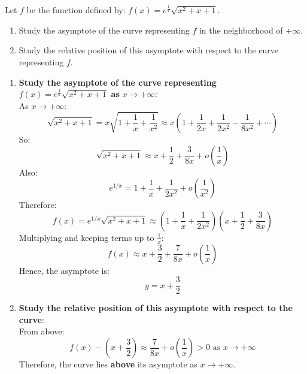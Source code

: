 \documentclass[12pt]{article}
\begin{document}
\newpage

\section{}
Let $f$ be the function defined by: $f(x) = e^{\frac{1}{x}}\sqrt{x^2 + x + 1}$.
\begin{enumerate}
    \item Study the asymptote of the curve representing $f$ in the neighborhood of $+\infty$.
    
    \item Study the relative position of this asymptote with respect to the curve representing $f$.
\end{enumerate}

\newpage

\begin{answerbox}
  \begin{enumerate}
    \item \textbf{Study the asymptote of the curve representing } $ f(x) = e^{\frac{1}{x}} \sqrt{x^2 + x + 1} $ \textbf{as } $ x \to +\infty $: \\
    As $ x \to +\infty $:
    $$
    \sqrt{x^2 + x + 1} = x \sqrt{1 + \frac{1}{x} + \frac{1}{x^2}} \approx x\left(1 + \frac{1}{2x} + \frac{1}{2x^2} - \frac{1}{8x^2} + \cdots\right)
    $$
    So:
    $$
    \sqrt{x^2 + x + 1} \approx x + \frac{1}{2} + \frac{3}{8x} + o\left(\frac{1}{x}\right)
    $$
    Also:
    $$
    e^{1/x} = 1 + \frac{1}{x} + \frac{1}{2x^2} + o\left(\frac{1}{x^2}\right)
    $$
    Therefore:
    $$
    f(x) = e^{1/x} \sqrt{x^2 + x + 1} \approx \left(1 + \frac{1}{x} + \frac{1}{2x^2}\right)\left(x + \frac{1}{2} + \frac{3}{8x}\right)
    $$
    Multiplying and keeping terms up to $ \frac{1}{x} $:
    $$
    f(x) \approx x + \frac{3}{2} + \frac{7}{8x} + o\left(\frac{1}{x}\right)
    $$
    Hence, the asymptote is:
    $$
    y = x + \frac{3}{2}
    $$

    \item \textbf{Study the relative position of this asymptote with respect to the curve}: \\
    From above:
    $$
    f(x) - \left(x + \frac{3}{2}\right) \approx \frac{7}{8x} + o\left(\frac{1}{x}\right) > 0 \text{ as } x \to +\infty
    $$
    Therefore, the curve lies \textbf{above} its asymptote as $ x \to +\infty $.
\end{enumerate}
\end{answerbox}

\end{document}
